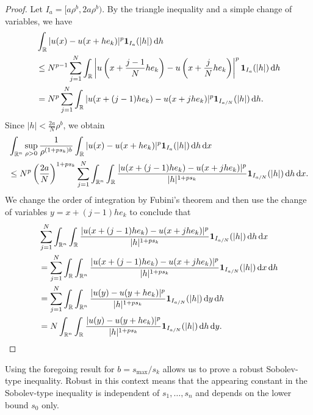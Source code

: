 \documentclass[11pt]{amsart}
\theoremstyle{plain}
\theoremstyle{definition}
\numberwithin{equation}{section}
\begin{document}
\begin{proof}
Let $I_a = [a\rho^{b}, 2a\rho^{b})$. By the triangle inequality and a simple change of variables, we have
\begin{equation*}
\begin{split}
&\int_{\mathbb{R}} |u(x) - u(x+he_k)|^p {\bf 1}_{I_a} (|h|) \,\mathrm{d}h \\
&\leq N^{p-1} \sum_{j=1}^N \int_{\mathbb{R}} \left| u\left( x + \frac{j-1}{N} he_k \right) - u\left(x+\frac{j}{N}he_k\right) \right|^p {\bf 1}_{I_a} (|h|) \,\mathrm{d}h \\
&= N^p \sum_{j=1}^N \int_{\mathbb{R}} |u(x + (j-1)he_k) - u(x+jhe_k)|^p {\bf 1}_{I_{a/N}} (|h|) \,\mathrm{d}h.
\end{split}
\end{equation*}
Since $|h| < \frac{2a}{N}\rho^{b}$, we obtain
\begin{equation*}
\begin{split}
&\int_{\mathbb{R}^n} \sup_{\rho > 0} \frac{1}{\rho^{(1+ps_k)b}} \int_{\mathbb{R}} |u(x) - u(x+he_k)|^p {\bf 1}_{I_a} (|h|) \,\mathrm{d}h \,\mathrm{d}x \\
&\leq N^p \left( \frac{2a}{N} \right)^{1+ps_k} \sum_{j=1}^N \int_{\mathbb{R}^n} \int_{\mathbb{R}} \frac{|u(x + (j-1)he_k) - u(x+jhe_k)|^p}{|h|^{1+ps_k}} {\bf 1}_{I_{a/N}} (|h|) \,\mathrm{d}h\,\mathrm{d}x.
\end{split}
\end{equation*}
We change the order of integration by Fubini's theorem and then use the change of variables $y=x+(j-1)he_k$ to conclude that
\begin{equation*}
\begin{split}
&\sum_{j=1}^N \int_{\mathbb{R}^n} \int_{\mathbb{R}} \frac{|u(x + (j-1)he_k) - u(x+jhe_k)|^p}{|h|^{1+ps_k}} {\bf 1}_{I_{a/N}} (|h|) \,\mathrm{d}h\,\mathrm{d}x \\
&= \sum_{j=1}^N \int_{\mathbb{R}} \int_{\mathbb{R}^n} \frac{|u(x + (j-1)he_k) - u(x+jhe_k)|^p}{|h|^{1+ps_k}} {\bf 1}_{I_{a/N}} (|h|) \,\mathrm{d}x\,\mathrm{d}h \\
&= \sum_{j=1}^N \int_{\mathbb{R}} \int_{\mathbb{R}^n} \frac{|u(y) - u(y+he_k)|^p}{|h|^{1+ps_k}} {\bf 1}_{I_{a/N}} (|h|) \,\mathrm{d}y\,\mathrm{d}h \\
&= N \int_{\mathbb{R}^n} \int_{\mathbb{R}} \frac{|u(y) - u(y+he_k)|^p}{|h|^{1+ps_k}} {\bf 1}_{I_{a/N}} (|h|) \,\mathrm{d}h\,\mathrm{d}y.
\end{split}
\end{equation*}
\end{proof}
Using the foregoing result for $b=s_{\max}/s_k$ allows us to prove a robust Sobolev-type inequality. Robust in this context means that the appearing constant in the Sobolev-type inequality is independent of $s_1,\dots,s_n$ and depends on the lower bound $s_0$ only.
\end{document}
